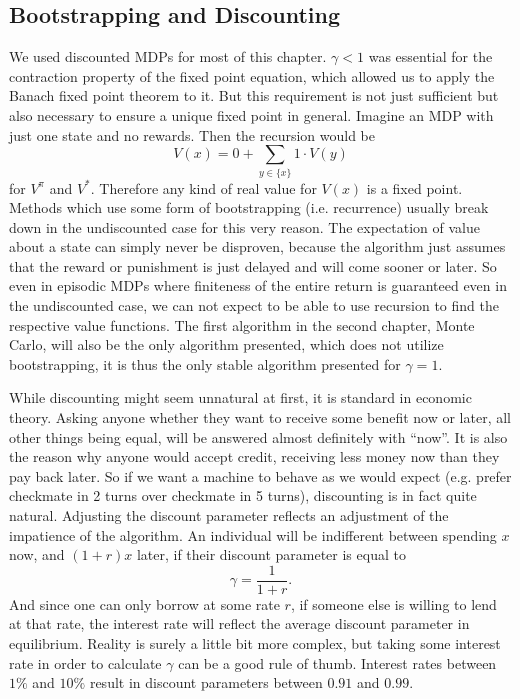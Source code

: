 \subsection{Bootstrapping and Discounting}\label{bootstrapping and discounting}

We used discounted MDPs for most of this chapter. \(\gamma<1\) was essential for the contraction property of the fixed point  equation, which allowed us to apply the Banach fixed point theorem to it. But this requirement is not just sufficient but also necessary to ensure a unique fixed point in general. Imagine an MDP with just one state and no rewards. Then the recursion would be
\[
	V(x)= 0 + \sum_{y\in\{x\}} 1\cdot V(y)
\]
for \(V^\pi\) and \(V^*\). Therefore any kind of real value for \(V(x)\) is a fixed point. Methods which use some form of bootstrapping (i.e. recurrence) usually break down in the undiscounted case for this very reason. The expectation of value about a state can simply never be disproven, because the algorithm just assumes that the reward or punishment is just delayed and will come sooner or later. So even in episodic MDPs where finiteness of the entire return is guaranteed even in the undiscounted case, we can not expect to be able to use recursion to find the respective value functions. The first algorithm in the second chapter, Monte Carlo, will also be the only algorithm presented, which does not utilize bootstrapping, it is thus the only stable algorithm presented for \(\gamma=1\). 

While discounting might seem unnatural at first, it is standard in economic theory. Asking anyone whether they want to receive some benefit now or later, all other things being equal, will be answered almost definitely with ``now''. It is also the reason why anyone would accept credit, receiving less money now than they pay back later. So if we want a machine to behave as we would expect (e.g. prefer checkmate in 2 turns over checkmate in 5 turns), discounting is in fact quite natural. Adjusting the discount parameter reflects an adjustment of the impatience of the algorithm. An individual will be indifferent between spending \(x\) now, and \((1+r)x\) later, if their discount parameter is equal to
\[
	\gamma=\frac{1}{1+r}.
\]
And since one can only borrow at some rate \(r\), if someone else is willing to lend at that rate, the interest rate will reflect the average discount parameter in equilibrium. Reality is surely a little bit more complex, but taking some interest rate in order to calculate \(\gamma\) can be a good rule of thumb. Interest rates between \(1\%\) and \(10\%\) result in discount parameters between \(0.91\) and \(0.99\).





\endinput